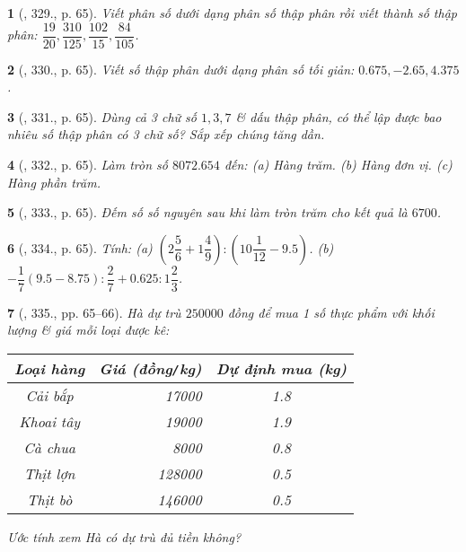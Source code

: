 \documentclass{article}
\newtheorem{baitoan}{}
\begin{document}
\begin{baitoan}[\cite{Tuyen_Toan_6}, 329., p. 65]
	Viết phân số dưới dạng phân số thập phân rồi viết thành số thập phân: $\dfrac{19}{20},\dfrac{310}{125},\dfrac{102}{15},\dfrac{84}{105}$.
\end{baitoan}

\begin{baitoan}[\cite{Tuyen_Toan_6}, 330., p. 65]
	Viết số thập phân dưới dạng phân số tối giản: $0.675,-2.65,4.375$.
\end{baitoan}

\begin{baitoan}[\cite{Tuyen_Toan_6}, 331., p. 65]
	Dùng cả 3 chữ số $1,3,7$ \& dấu thập phân, có thể lập được bao nhiêu số thập phân có 3 chữ số? Sắp xếp chúng tăng dần.
\end{baitoan}

\begin{baitoan}[\cite{Tuyen_Toan_6}, 332., p. 65]
	Làm tròn số $8072.654$ đến: (a) Hàng trăm. (b) Hàng đơn vị. (c) Hàng phần trăm.
\end{baitoan}

\begin{baitoan}[\cite{Tuyen_Toan_6}, 333., p. 65]
	Đếm số số nguyên sau khi làm tròn trăm cho kết quả là $6700$.
\end{baitoan}

\begin{baitoan}[\cite{Tuyen_Toan_6}, 334., p. 65]
	Tính: (a) $\left(2\dfrac{5}{6} + 1\dfrac{4}{9}\right):\left(10\dfrac{1}{12} - 9.5\right)$. (b) $-\dfrac{1}{7}(9.5 - 8.75):\dfrac{2}{7} + 0.625:1\dfrac{2}{3}$.
\end{baitoan}

\begin{baitoan}[\cite{Tuyen_Toan_6}, 335., pp. 65--66]
	Hà dự trù $250000$ đồng để mua 1 số thực phẩm với khối lượng \& giá mỗi loại được kê:
	\begin{table}[H]
		\centering
		\begin{tabular}{|c|r|c|}
			\hline
			Loại hàng & Giá (đồng{\tt/}kg) & Dự định mua (kg) \\
			\hline
			Cải bắp & 17000 & 1.8 \\
			\hline
			Khoai tây & 19000 & 1.9 \\
			\hline
			Cà chua & 8000 & 0.8 \\
			\hline
			Thịt lợn & 128000 & 0.5 \\
			\hline
			Thịt bò & 146000 & 0.5 \\
			\hline
		\end{tabular}
	\end{table}
	Ước tính xem Hà có dự trù đủ tiền không?
\end{baitoan}
\end{document}
